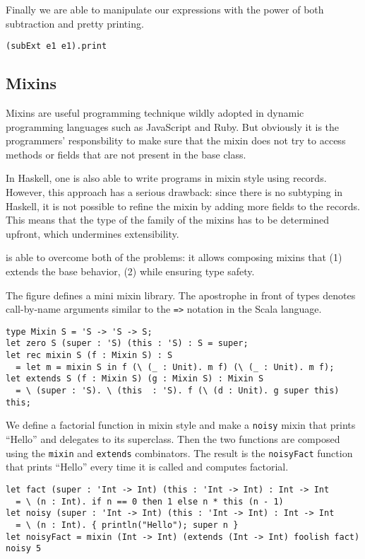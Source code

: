 Finally we are able to manipulate our expressions with the power of both
subtraction and pretty printing.
\begin{lstlisting}
(subExt e1 e1).print
\end{lstlisting}

\subsection{Mixins}

Mixins are useful programming technique wildly adopted in dynamic programming
languages such as JavaScript and Ruby. But obviously it is the programmers'
responsbility to make sure that the mixin does not try to access methods or
fields that are not present in the base class.

In Haskell, one is also able to write programs in mixin style using records.
However, this approach has a serious drawback: since there is no subtyping in
Haskell, it is not possible to refine the mixin by adding more fields to the
records. This means that the type of the family of the mixins has to be
determined upfront, which undermines extensibility.

\name is able to overcome both of the problems: it allows composing mixins
that (1) extends the base behavior, (2) while ensuring type safety.

The figure defines a mini mixin library. The apostrophe in front of types
denotes call-by-name arguments similar to the \lstinline{=>} notation in the
Scala language.

\begin{lstlisting}
type Mixin S = 'S -> 'S -> S;
let zero S (super : 'S) (this : 'S) : S = super;
let rec mixin S (f : Mixin S) : S
  = let m = mixin S in f (\ (_ : Unit). m f) (\ (_ : Unit). m f);
let extends S (f : Mixin S) (g : Mixin S) : Mixin S
  = \ (super : 'S). \ (this  : 'S). f (\ (d : Unit). g super this) this;
\end{lstlisting}

We define a factorial function in mixin style and make a \lstinline{noisy} mixin
that prints ``Hello'' and delegates to its superclass. Then the two functions
are composed using the \lstinline{mixin} and \lstinline{extends} combinators.
The result is the \lstinline{noisyFact} function that prints ``Hello'' every
time it is called and computes factorial.
\begin{lstlisting}
let fact (super : 'Int -> Int) (this : 'Int -> Int) : Int -> Int
  = \ (n : Int). if n == 0 then 1 else n * this (n - 1)
let noisy (super : 'Int -> Int) (this : 'Int -> Int) : Int -> Int
  = \ (n : Int). { println("Hello"); super n }
let noisyFact = mixin (Int -> Int) (extends (Int -> Int) foolish fact)
noisy 5
\end{lstlisting}

